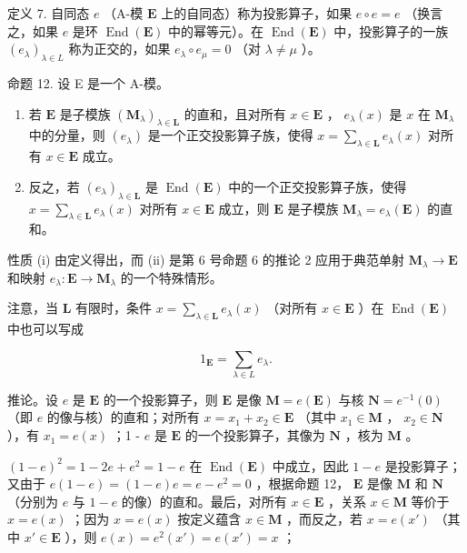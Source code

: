 定义 7. 自同态 \(e\) （A-模 \(\mathbf{E}\) 上的自同态）称为投影算子，如果 \(e \circ e = e\) （换言之，如果 \(e\) 是环 \(\operatorname{End}(\mathbf{E})\) 中的幂等元）。在 \(\operatorname{End}(\mathbf{E})\) 中，投影算子的一族 \((e_{\lambda})_{\lambda \in L}\) 称为正交的，如果 \(e_{\lambda} \circ e_{\mu} = 0\) （对 \(\lambda \neq \mu\) ）。

命题 12. 设 E 是一个 A-模。

\begin{enumerate}
\def\labelenumi{(\roman{enumi})}
\item
  若 \(\mathbf{E}\) 是子模族 \((\mathbf{M}_{\lambda})_{\lambda \in \mathbf{L}}\) 的直和，且对所有 \(x \in \mathbf{E}\) ， \(e_{\lambda}(x)\) 是 \(x\) 在 \(\mathbf{M}_{\lambda}\) 中的分量，则 \((e_{\lambda})\) 是一个正交投影算子族，使得 \(x = \sum_{\lambda \in \mathbf{L}} e_{\lambda}(x)\) 对所有 \(x \in \mathbf{E}\) 成立。
\item
  反之，若 \((e_{\lambda})_{\lambda \in \mathbf{L}}\) 是 \(\operatorname{End}(\mathbf{E})\) 中的一个正交投影算子族，使得 \(x = \sum_{\lambda \in \mathbf{L}} e_{\lambda}(x)\) 对所有 \(x \in \mathbf{E}\) 成立，则 \(\mathbf{E}\) 是子模族 \(\mathbf{M}_{\lambda} = e_{\lambda}(\mathbf{E})\) 的直和。
\end{enumerate}

性质 (i) 由定义得出，而 (ii) 是第 6 号命题 6 的推论 2 应用于典范单射 \(\mathbf{M}_{\lambda} \to \mathbf{E}\) 和映射 \(e_{\lambda}: \mathbf{E} \to \mathbf{M}_{\lambda}\) 的一个特殊情形。

注意，当 \(\mathbf{L}\) 有限时，条件 \(x = \sum_{\lambda \in \mathbf{L}} e_{\lambda}(x)\) （对所有 \(x \in \mathbf{E}\) ）在 \(\operatorname{End}(\mathbf{E})\) 中也可以写成

\[
1 _ {\mathbf {E}} = \sum_ {\lambda \in L} e _ {\lambda}.\tag{31}
\]

推论。设 \(e\) 是 \(\mathbf{E}\) 的一个投影算子，则 \(\mathbf{E}\) 是像 \(\mathbf{M} = e(\mathbf{E})\) 与核 \(\mathbf{N} = e^{-1}(0)\) （即 \(e\) 的像与核）的直和；对所有 \(x = x_1 + x_2 \in \mathbf{E}\) （其中 \(x_1 \in \mathbf{M}\) ， \(x_2 \in \mathbf{N}\) ），有 \(x_1 = e(x)\) ；1 - \(e\) 是 \(\mathbf{E}\) 的一个投影算子，其像为 \(\mathbf{N}\) ，核为 \(\mathbf{M}\) 。

\((1 - e)^2 = 1 - 2e + e^2 = 1 - e\) 在 \(\operatorname{End}(\mathbf{E})\) 中成立，因此 \(1 - e\) 是投影算子；又由于 \(e(1 - e) = (1 - e)e = e - e^2 = 0\) ，根据命题 12， \(\mathbf{E}\) 是像 \(\mathbf{M}\) 和 \(\mathbf{N}\) （分别为 \(e\) 与 \(1 - e\) 的像）的直和。最后，对所有 \(x \in \mathbf{E}\) ，关系 \(x \in \mathbf{M}\) 等价于 \(x = e(x)\) ；因为 \(x = e(x)\) 按定义蕴含 \(x \in \mathbf{M}\) ，而反之，若 \(x = e(x')\) （其中 \(x' \in \mathbf{E}\) ），则 \(e(x) = e^2(x') = e(x') = x\) ；

